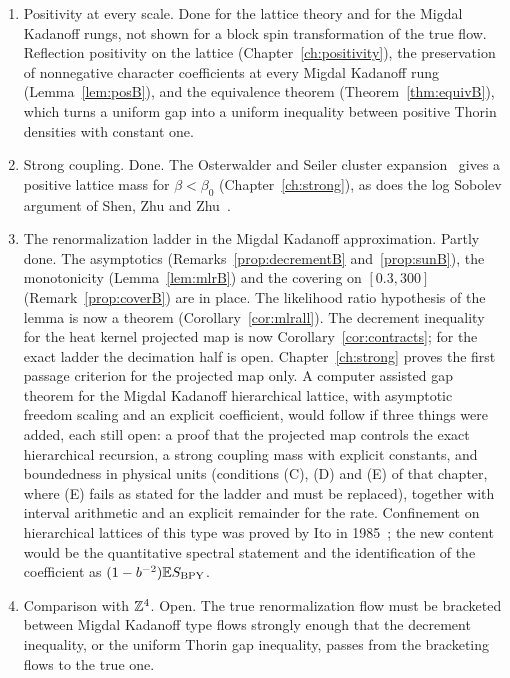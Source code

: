 \begin{enumerate}
\item[(i)] Positivity at every scale. Done for the lattice theory and for the Migdal Kadanoff rungs, not shown for a block spin transformation of the true flow. Reflection positivity on the lattice (Chapter~\ref{ch:positivity}), the preservation of nonnegative character coefficients at every Migdal Kadanoff rung (Lemma~\ref{lem:posB}), and the equivalence theorem (Theorem~\ref{thm:equivB}), which turns a uniform gap into a uniform inequality between positive Thorin densities with constant one.
\item[(ii)] Strong coupling. Done. The Osterwalder and Seiler cluster expansion~\cite{OSe} gives a positive lattice mass for $\beta<\beta_0$ (Chapter~\ref{ch:strong}), as does the log Sobolev argument of Shen, Zhu and Zhu~\cite{SZZ}.
\item[(iii)] The renormalization ladder in the Migdal Kadanoff approximation. Partly done. The asymptotics (Remarks~\ref{prop:decrementB} and~\ref{prop:sunB}), the monotonicity (Lemma~\ref{lem:mlrB}) and the covering on $[0.3,300]$ (Remark~\ref{prop:coverB}) are in place. The likelihood ratio hypothesis of the lemma is now a theorem (Corollary~\ref{cor:mlrall}). The decrement inequality for the heat kernel projected map is now Corollary~\ref{cor:contracts}; for the exact ladder the decimation half is open. Chapter~\ref{ch:strong} proves the first passage criterion for the projected map only. A computer assisted gap theorem for the Migdal Kadanoff hierarchical lattice, with asymptotic freedom scaling and an explicit coefficient, would follow if three things were added, each still open: a proof that the projected map controls the exact hierarchical recursion, a strong coupling mass with explicit constants, and boundedness in physical units (conditions (C), (D) and (E) of that chapter, where (E) fails as stated for the ladder and must be replaced), together with interval arithmetic and an explicit remainder for the rate. Confinement on hierarchical lattices of this type was proved by Ito in 1985~\cite{Ito85}; the new content would be the quantitative spectral statement and the identification of the coefficient as $(1-b^{-2})\mathbb{E} S_{\mathrm{BPY}}$.
\item[(iv)] Comparison with $\mathbb{Z}^4$. Open. The true renormalization flow must be bracketed between Migdal Kadanoff type flows strongly enough that the decrement inequality, or the uniform Thorin gap inequality, passes from the bracketing flows to the true one.

\end{enumerate}
